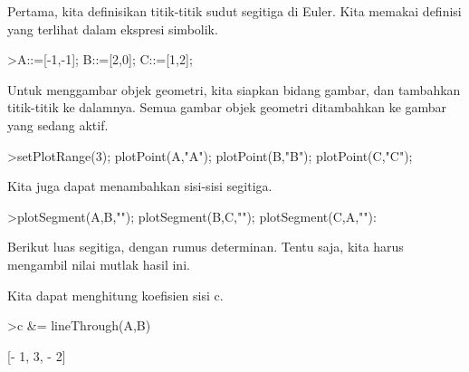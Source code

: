 \documentclass[a4paper,10pt]{article}
\begin{document}
\begin{eulernotebook}
\begin{eulercomment}
\begin{eulercomment}
\begin{eulercomment}
\begin{eulercomment}
\begin{eulercomment}
\begin{eulercomment}
\begin{eulercomment}
\begin{eulercomment}
\begin{eulercomment}
\begin{eulercomment}
\begin{eulercomment}
Pertama, kita definisikan titik-titik sudut segitiga di Euler. Kita memakai definisi yang
terlihat dalam ekspresi simbolik.
\end{eulercomment}
\begin{eulerprompt}
>A::=[-1,-1]; B::=[2,0]; C::=[1,2];
\end{eulerprompt}
\begin{eulercomment}
Untuk menggambar objek geometri, kita siapkan bidang gambar, dan tambahkan titik-titik ke
dalamnya. Semua gambar objek geometri ditambahkan ke gambar yang sedang aktif.
\end{eulercomment}
\begin{eulerprompt}
>setPlotRange(3); plotPoint(A,"A"); plotPoint(B,"B"); plotPoint(C,"C");
\end{eulerprompt}
\begin{eulercomment}
Kita juga dapat menambahkan sisi-sisi segitiga.
\end{eulercomment}
\begin{eulerprompt}
>plotSegment(A,B,""); plotSegment(B,C,""); plotSegment(C,A,""):
\end{eulerprompt}
\begin{eulercomment}
Berikut luas segitiga, dengan rumus determinan. Tentu saja, kita harus mengambil nilai
mutlak hasil ini.
\end{eulercomment}
\begin{eulercomment}
Kita dapat menghitung koefisien sisi c.
\end{eulercomment}
\begin{eulerprompt}
>c &= lineThrough(A,B)
\end{eulerprompt}
\begin{euleroutput}
  
                              [- 1, 3, - 2]
  

\end{euleroutput}
\end{eulercomment}
\end{eulercomment}
\end{eulercomment}
\end{eulercomment}
\end{eulercomment}
\end{eulercomment}
\end{eulercomment}
\end{eulercomment}
\end{eulercomment}
\end{eulercomment}
\end{eulernotebook}
\end{document}
